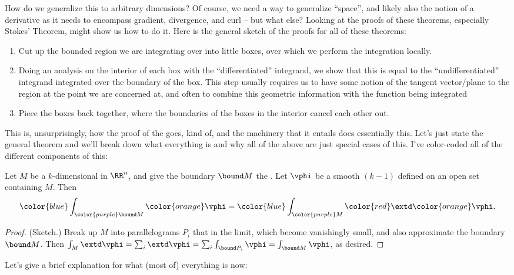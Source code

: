 \documentclass[12pt]{article}
\begin{document}
How do we generalize this to arbitrary dimensions? Of course, we need a way to 
generalize ``space'', and likely also the notion of a derivative as it needs
to encompass gradient, divergence, and curl -- but what else? 
Looking at the proofs of these
theorems, especially Stokes' Theorem, might show us how to do it. Here is the
general sketch of the proofs for all of these theorems:
\begin{enumerate}
  \item Cut up the bounded region we are integrating over into little boxes,
    over which we perform the integration locally. 
  \item Doing an analysis on the interior of each box with the
    ``differentiated'' integrand, we show that this is equal to the
    ``undifferentiated'' integrand integrated over the boundary of the box.
    This step usually requires us to have some notion of the tangent
    vector/plane to the region at the point we are concerned at, and often to 
    combine this geometric information with the function being integrated  
  \item Piece the boxes back together, where the boundaries of the boxes in the
    interior cancel each other out.  
\end{enumerate}
This is, unsurprisingly, how the proof of the 
goes, kind of, and the machinery that it entails does essentially this. 
Let's just state the general theorem and we'll break down what
everything is and why all of the above are just special cases of this. I've
color-coded all of the different components of this: 
\begin{theorem}
  Let {\color{purple}$M$} be a $k$-dimensional   in $\RR^n$, and give the boundary
  {\color{purple}$\bound M$} the . Let
  {\color{orange}$\vphi$} be a smooth
  {\color{orange}$(k-1)$} defined on an open set
  containing $M$. Then 
  \[
    {\color{blue}\int_{\color{purple}\bound M} {\color{orange}\vphi}} =
    {\color{blue}\int_{\color{purple}
    M} {\color{red}\extd} {\color{orange}\vphi}}.
  \] 
\end{theorem}
\begin{proof}
  (Sketch.) Break up $M$ into parallelograms $P_i$ that in the limit, which 
  become vanishingly small, and also approximate the boundary $\bound M$. 
  Then $\int_M \extd\vphi = 
  \sum_i \extd\vphi = \sum_i \int_{\bound P_i} \vphi = \int_{\bound M} \vphi$, as desired. 
\end{proof}
\noindent Let's give a brief explanation for what (most of) everything is now: 
  
\end{document}
